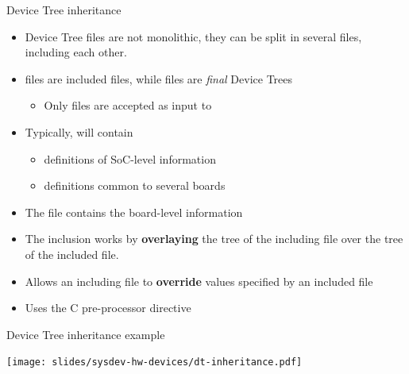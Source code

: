 \begin{frame}[fragile]{Device Tree inheritance}
  \begin{itemize}
  \item Device Tree files are not monolithic, they can be split in
    several files, including each other.
  \item {} files are included files, while  files
    are {\em final} Device Trees
    \begin{itemize}
    \item Only  files are accepted as input to 
    \end{itemize}
  \item Typically,  will contain
    \begin{itemize}
    \item definitions of SoC-level information
    \item definitions common to several boards
    \end{itemize}
  \item The  file contains the board-level information
  \item The inclusion works by {\bf overlaying} the tree of the
    including file over the tree of the included file.
  \item Allows an including file to {\bf override} values specified by
    an included file
  \item Uses the C pre-processor  directive
  \end{itemize}
\end{frame}

\begin{frame}{Device Tree inheritance example}
  \begin{center}
    \texttt{[image: slides/sysdev-hw-devices/dt-inheritance.pdf]}
  \end{center}
\end{frame}

